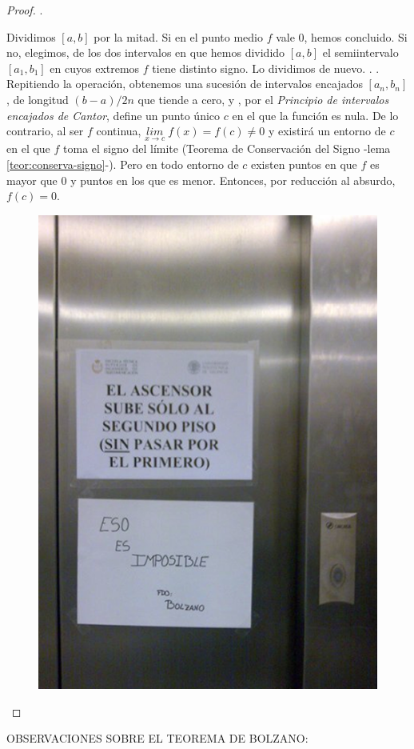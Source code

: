 	\begin{proof}.
	\begin{multicols}{2}
	Dividimos $[a, b]$ por la mitad. Si en el punto medio $f$ vale $0$, hemos concluido. Si no, elegimos, de los dos intervalos en que hemos dividido $[a,b]$ el semiintervalo $[a_1,b_1]$ en cuyos extremos $f$ tiene distinto signo. Lo dividimos de nuevo. . . Repitiendo la operación, obtenemos una sucesión de intervalos encajados $[a_n, b_n]$, de longitud $(b - a)/2n$ que tiende a cero, y , por el \emph{Principio de intervalos encajados de Cantor}, define un punto único $c$ en el que la función es nula. De lo contrario, al ser $f$ continua, $\underset {x\to c}{lim}\; {f (x)} = f (c) \neq 0$ y existirá un entorno de $c$ en el que $f$ toma el signo del límite (Teorema de Conservación del Signo -lema \ref{teor:conserva-signo}-). Pero en todo entorno de $c$ existen puntos en que $f$ es mayor que $0$ y puntos en los que es menor. Entonces, por reducción al absurdo, $f(c) = 0$. 

	\begin{figure}[H]
 		\centering
		\includegraphics[width=.3\textwidth]{imagenes/imagenes03/xiste03.png}
	\end{figure}
	\end{multicols}

\end{proof}

	OBSERVACIONES SOBRE EL TEOREMA DE BOLZANO:
	
